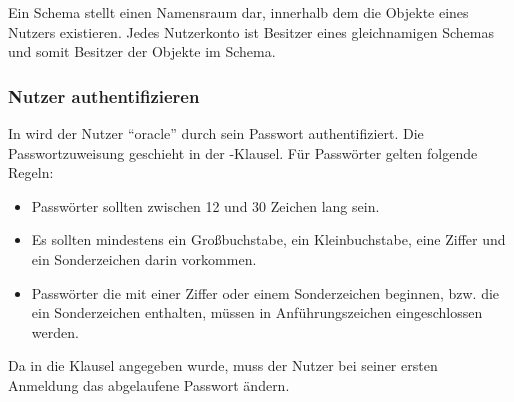 
          \begin{merke}
            Ein Schema stellt einen Namensraum dar, innerhalb dem die Objekte eines Nutzers existieren. Jedes Nutzerkonto ist Besitzer eines gleichnamigen Schemas und somit Besitzer der Objekte im Schema.
          \end{merke}
        \subsubsection{Nutzer authentifizieren}
          In  wird der Nutzer \enquote{oracle} durch sein Passwort authentifiziert. Die  Passwortzuweisung geschieht in der -Klausel. F\"ur Passw\"orter gelten folgende Regeln:
          \begin{itemize}
            \item Passw\"orter sollten zwischen 12 und 30 Zeichen lang sein.
            \item Es sollten mindestens ein Gro\ss{}buchstabe, ein Kleinbuchstabe, eine Ziffer und ein Sonderzeichen darin vorkommen.
            \item Passw\"orter die mit einer Ziffer oder einem Sonderzeichen beginnen, bzw. die ein Sonderzeichen enthalten, m\"ussen in Anf\"uhrungszeichen eingeschlossen werden.
          \end{itemize}
          Da in  die Klausel  angegeben wurde, muss der Nutzer bei seiner ersten Anmeldung das abgelaufene Passwort \"andern.
